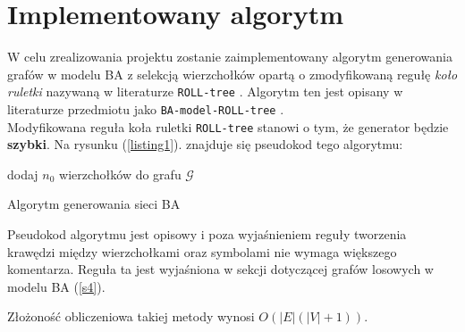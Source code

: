\documentclass{article}
\begin{document}
\section{Implementowany algorytm \label{s2}}
	W celu zrealizowania projektu zostanie zaimplementowany algorytm generowania grafów w modelu BA z selekcją wierzchołków 
	opartą o zmodyfikowaną regułę \textit{koło ruletki} nazywaną w literaturze \texttt{ROLL-tree} \cite{rolltree}. Algorytm ten jest opisany w literaturze przedmiotu jako \texttt{BA-model-ROLL-tree} \cite{simpleRW}.\\
	Modyfikowana reguła koła ruletki \texttt{ROLL-tree} stanowi o tym, że generator będzie \textbf{szybki}. 
	Na rysunku (\ref{listing1}). znajduje się pseudokod tego algorytmu:\\
	\begin{algorithm}[H]
		dodaj $n_0$ wierzchołków do grafu $\mathcal{G}$ \\
		\label{listing1}
		\caption{Algorytm generowania sieci BA}
	\end{algorithm}
	Pseudokod algorytmu jest opisowy i poza wyjaśnieniem reguły tworzenia krawędzi między
	wierzchołkami oraz symbolami nie wymaga większego komentarza. Reguła ta jest wyjaśniona w sekcji dotyczącej grafów losowych
	w modelu BA (\ref{s4}). \\
\begin{table}[H]
\end{table}
	Złożoność obliczeniowa takiej metody wynosi $O(|E|(|V|+1))$. \\
\end{document}
